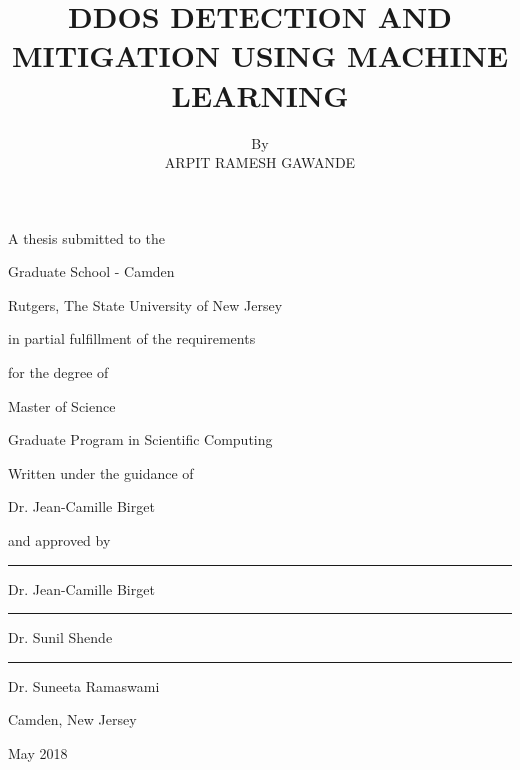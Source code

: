 \documentclass[12pt,oneside,a4paper]{article}
\title{DDOS DETECTION AND MITIGATION USING MACHINE LEARNING}
\author{By \\ ARPIT RAMESH GAWANDE}
\date{}
\begin{document}
\begin{titlepage}
  \centering
  \maketitle
  A thesis submitted to the\par
  Graduate School - Camden\par
  Rutgers, The State University of New Jersey\par
  in partial fulfillment of the requirements\par
  for the degree of \par
  Master of Science\par
  Graduate Program in Scientific Computing\par
  Written under the guidance of\par
  Dr. Jean-Camille Birget\par
  and approved by\par
  \vspace{3mm}
  \noindent\rule{6cm}{0.4pt} \par
  Dr. Jean-Camille Birget\par
  \vspace{3mm}
  \noindent\rule{6cm}{0.4pt} \par
  Dr. Sunil Shende\par
  \vspace{3mm}
  \noindent\rule{6cm}{0.4pt} \par
  Dr. Suneeta Ramaswami\par
  \vfill
  Camden, New Jersey\par
  {May 2018}
\end{titlepage}
\end{document}
